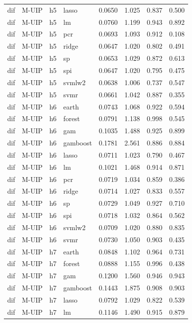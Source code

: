 \begin{ThreePartTable}
\begin{longtable}[t]{llclcccc}
dif & M-UIP & h5 & lasso & 0.0650 & 1.025 & 0.837 & 0.500\\
dif & M-UIP & h5 & lm & 0.0760 & 1.199 & 0.943 & 0.892\\
dif & M-UIP & h5 & pcr & 0.0693 & 1.093 & 0.912 & 0.108\\
dif & M-UIP & h5 & ridge & 0.0647 & 1.020 & 0.802 & 0.491\\
dif & M-UIP & h5 & sp & 0.0653 & 1.029 & 0.872 & 0.613\\
dif & M-UIP & h5 & spi & 0.0647 & 1.020 & 0.795 & 0.475\\
dif & M-UIP & h5 & svmlw2 & 0.0638 & 1.006 & 0.737 & 0.547\\
dif & M-UIP & h5 & svmr & 0.0661 & 1.042 & 0.887 & 0.355\\
\addlinespace
dif & M-UIP & h6 & earth & 0.0743 & 1.068 & 0.922 & 0.594\\
dif & M-UIP & h6 & forest & 0.0791 & 1.138 & 0.998 & 0.545\\
dif & M-UIP & h6 & gam & 0.1035 & 1.488 & 0.925 & 0.899\\
dif & M-UIP & h6 & gamboost & 0.1781 & 2.561 & 0.886 & 0.884\\
dif & M-UIP & h6 & lasso & 0.0711 & 1.023 & 0.790 & 0.467\\
dif & M-UIP & h6 & lm & 0.1021 & 1.468 & 0.914 & 0.871\\
dif & M-UIP & h6 & pcr & 0.0719 & 1.034 & 0.859 & 0.386\\
dif & M-UIP & h6 & ridge & 0.0714 & 1.027 & 0.833 & 0.557\\
dif & M-UIP & h6 & sp & 0.0729 & 1.049 & 0.927 & 0.710\\
dif & M-UIP & h6 & spi & 0.0718 & 1.032 & 0.864 & 0.562\\
dif & M-UIP & h6 & svmlw2 & 0.0709 & 1.020 & 0.880 & 0.835\\
dif & M-UIP & h6 & svmr & 0.0730 & 1.050 & 0.903 & 0.435\\
\addlinespace
dif & M-UIP & h7 & earth & 0.0848 & 1.102 & 0.964 & 0.731\\
dif & M-UIP & h7 & forest & 0.0888 & 1.155 & 0.996 & 0.438\\
dif & M-UIP & h7 & gam & 0.1200 & 1.560 & 0.946 & 0.943\\
dif & M-UIP & h7 & gamboost & 0.1443 & 1.875 & 0.908 & 0.903\\
dif & M-UIP & h7 & lasso & 0.0792 & 1.029 & 0.822 & 0.539\\
dif & M-UIP & h7 & lm & 0.1146 & 1.490 & 0.915 & 0.879\\

\end{longtable}
\end{ThreePartTable}
